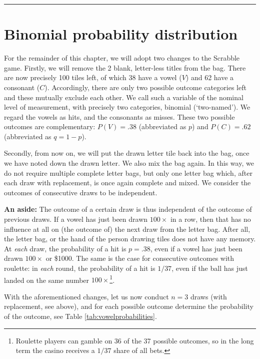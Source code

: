 \documentclass[
]{book}
\begin{document}
\begin{center}\rule{0.5\linewidth}{0.5pt}\end{center}

\hypertarget{sec:binomial-distribution}{%
\section{Binomial probability distribution}\label{sec:binomial-distribution}}

For the remainder of this chapter, we will adopt two changes to the
Scrabble game. Firstly, we will remove the 2 blank, letter-less titles
from the bag. There are now precisely 100 tiles left, of which
38 have a vowel (\(V\)) and 62 have a consonant (\(C\)). Accordingly, there are only
two possible outcome categories left and these mutually exclude each other.
We call such a variable of the nominal level of measurement,
with precisely two categories, binomial (`two-named'). We regard the
vowels as hits, and the consonants as
misses. These two possible outcomes are complementary:
\(P(V)=.38\) (abbreviated as \(p\)) and \(P(C)=.62\) (abbreviated as
\(q=1-p\)).

Secondly, from now on, we will put the drawn letter tile back into the bag,
once we have noted down the drawn letter. We also mix the bag again.
In this way, we do not require
multiple complete letter bags, but only one letter bag which, after each
draw with replacement, is once again complete and mixed.
We consider the outcomes of consecutive draws to be
independent.

\textbf{An aside:} The outcome of a certain draw is thus independent of the outcome
of previous draws. If a vowel has just been drawn \(100\times\) in a row,
then that has no influence at all on (the outcome of)
the next draw from the letter bag. After all, the
letter bag, or the hand of the person drawing tiles does not have any memory. At
\emph{each} draw, the probability of a hit is \(p=.38\), even if a vowel
has just been drawn \(100\times\) or \$1000\times. The same is the case
for consecutive outcomes with roulette: in \emph{each} round, the probability
of a hit is \(1/37\), even if the ball has just landed on the same number \(100\times\)\footnote{Roulette players can gamble on 36 of the 37 possible outcomes, so in the long term the casino receives a \(1/37\) share of all bets.}.

With the aforementioned changes, let us now conduct \(n=3\) draws
(with replacement, see above), and for each possible outcome determine
the probability of the outcome, see
Table \ref{tab:vowelprobabilities}.
\end{document}
